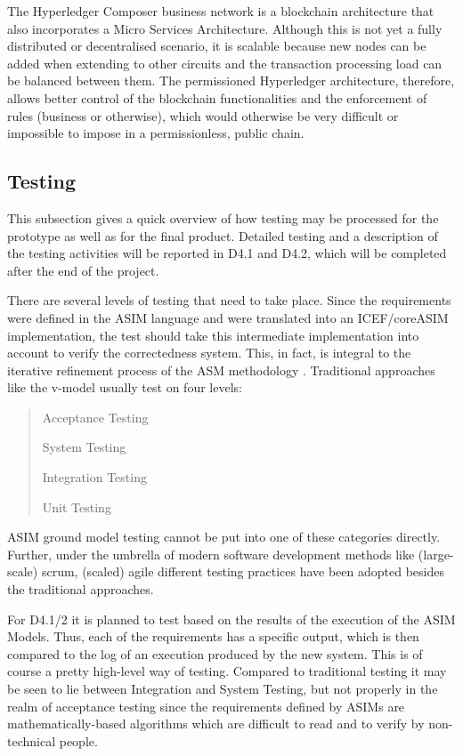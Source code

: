 The Hyperledger Composer business network is a blockchain architecture that also incorporates a Micro Services Architecture. Although this is not yet a fully distributed or decentralised scenario, it is scalable because new nodes can be added when extending to other circuits and the transaction processing load can be balanced between them. The permissioned Hyperledger architecture, therefore, allows better control of the blockchain functionalities and the enforcement of rules (business or otherwise), which would otherwise be very difficult or impossible to impose in a permissionless, public chain.

\subsection{Testing}

This subsection gives a quick overview of how testing may be processed for the prototype as well as for the final product. Detailed testing and a description of the testing activities will be reported in D4.1 and D4.2, which will be completed after the end of the project.

There are several levels of testing that need to take place. Since the requirements were defined in the ASIM language and were translated into an ICEF/coreASIM implementation, the test should take this intermediate implementation into account to verify the correctedness system. This, in fact, is integral to the iterative refinement process of the ASM methodology \cite{BoergerStaerk2003}. Traditional approaches like the v-model \cite{forsberg1991relationship} usually test on four levels:
\begin{quote}
\begin{packed_item1}
	\item Acceptance Testing
	\item System Testing
	\item Integration Testing
	\item Unit Testing
\end{packed_item1}
\end{quote}

ASIM ground model testing cannot be put into one of these categories directly. Further, under the umbrella of modern software development methods like (large-scale) scrum, (scaled) agile different testing practices have been adopted besides the traditional approaches.

For D4.1/2 it is planned to test based on the results of the execution of the ASIM Models. Thus, each of the requirements has a specific output, which is then compared to the log of an execution produced by the new system. This is of course a pretty high-level way of testing. Compared to traditional testing it may be seen to lie between Integration and System Testing, but not properly in the realm of acceptance testing since the requirements defined by ASIMs are mathematically-based algorithms which are difficult to read and to verify by non-technical people.

